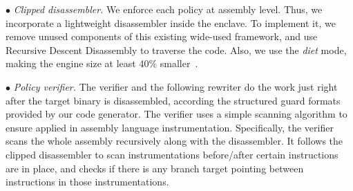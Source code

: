 \vspace{2pt}\noindent$\bullet$\textit{ Clipped disassembler.} 
We enforce each policy at assembly level. 
Thus, we incorporate a lightweight disassembler inside the enclave. To implement it, we remove unused components of this existing wide-used framework, and use Recursive Descent Disassembly to traverse the code. \DIFaddbegin {}\DIFaddend Also, we use the \textit{diet} mode, making the engine size at least 40\% smaller~\cite{quynh2014capstone}. \DIFaddbegin {}\DIFaddend 



\vspace{2pt}\noindent$\bullet$\textit{ Policy verifier.}\label{subsec-policyverifer}
The verifier and the following rewriter do the work just right after the target binary is disassembled, according the structured guard formats provided by our code generator. The verifier uses a simple scanning algorithm to ensure \DIFdelbegin {}\DIFdelend \DIFaddbegin {}\DIFaddend applied in assembly language instrumentation. 
Specifically, the verifier scans the whole assembly recursively along with the disassembler. It follows the clipped disassembler to scan instrumentations before/after certain instructions are in place, and checks if there is any branch target pointing between instructions in those instrumentations.

